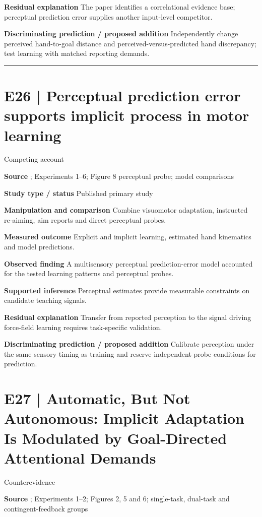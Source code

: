 \documentclass[11pt,a4paper]{article}
\begin{document}
\textbf{Residual explanation} The paper identifies a correlational evidence base; perceptual prediction error supplies another input-level competitor.\par
\textbf{Discriminating prediction / proposed addition} Independently change perceived hand-to-goal distance and perceived-versus-predicted hand discrepancy; test learning with matched reporting demands.\par
\bigskip\hrule\medskip\section{E26 | Perceptual prediction error supports implicit process in motor learning}
{\small\sffamily\color{navy} Competing account}\par
\textbf{Source} \cite{percept2026}; Experiments 1--6; Figure 8 perceptual probe; model comparisons\par
\textbf{Study type / status} Published primary study\par
\textbf{Manipulation and comparison} Combine visuomotor adaptation, instructed re-aiming, aim reports and direct perceptual probes.\par
\textbf{Measured outcome} Explicit and implicit learning, estimated hand kinematics and model predictions.\par
\textbf{Observed finding} A multisensory perceptual prediction-error model accounted for the tested learning patterns and perceptual probes.\par
\textbf{Supported inference} Perceptual estimates provide measurable constraints on candidate teaching signals.\par
\textbf{Residual explanation} Transfer from reported perception to the signal driving force-field learning requires task-specific validation.\par
\textbf{Discriminating prediction / proposed addition} Calibrate perception under the same sensory timing as training and reserve independent probe conditions for prediction.\par
\clearpage\section{E27 | Automatic, But Not Autonomous: Implicit Adaptation Is Modulated by Goal-Directed Attentional Demands}
{\small\sffamily\color{navy} Counterevidence}\par
\textbf{Source} \cite{attention2026}; Experiments 1--2; Figures 2, 5 and 6; single-task, dual-task and contingent-feedback groups\par
\end{document}
